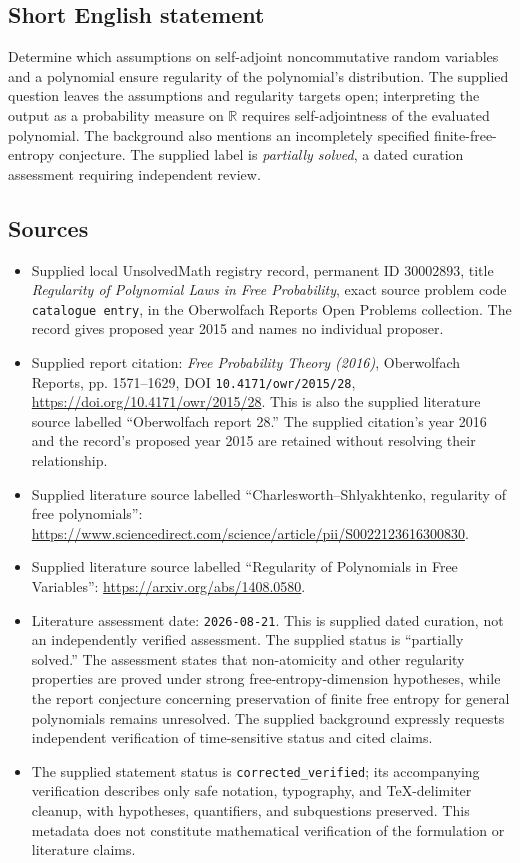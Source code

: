 \documentclass[11pt]{article}
\newcommand{\R}{\mathbb{R}}
\begin{document}
\subsection{Short English statement}
Determine which assumptions on self-adjoint noncommutative random variables and a polynomial ensure regularity of the polynomial's distribution. The supplied question leaves the assumptions and regularity targets open; interpreting the output as a probability measure on \(\R\) requires self-adjointness of the evaluated polynomial. The background also mentions an incompletely specified finite-free-entropy conjecture. The supplied label is \emph{partially solved}, a dated curation assessment requiring independent review.
\subsection{Sources}
\begin{itemize}
\item Supplied local UnsolvedMath registry record, permanent ID \(30002893\), title \emph{Regularity of Polynomial Laws in Free Probability}, exact source problem code \texttt{catalogue entry}, in the Oberwolfach Reports Open Problems collection. The record gives proposed year 2015 and names no individual proposer.
\item Supplied report citation: \emph{Free Probability Theory (2016)}, Oberwolfach Reports, pp. 1571--1629, DOI \texttt{10.4171/owr/2015/28}, \url{https://doi.org/10.4171/owr/2015/28}. This is also the supplied literature source labelled ``Oberwolfach report 28.'' The supplied citation's year 2016 and the record's proposed year 2015 are retained without resolving their relationship.
\item Supplied literature source labelled ``Charlesworth--Shlyakhtenko, regularity of free polynomials'': \url{https://www.sciencedirect.com/science/article/pii/S0022123616300830}.
\item Supplied literature source labelled ``Regularity of Polynomials in Free Variables'': \url{https://arxiv.org/abs/1408.0580}.
\item Literature assessment date: \texttt{2026-08-21}. This is supplied dated curation, not an independently verified assessment. The supplied status is ``partially solved.'' The assessment states that non-atomicity and other regularity properties are proved under strong free-entropy-dimension hypotheses, while the report conjecture concerning preservation of finite free entropy for general polynomials remains unresolved. The supplied background expressly requests independent verification of time-sensitive status and cited claims.
\item The supplied statement status is \texttt{corrected\_verified}; its accompanying verification describes only safe notation, typography, and TeX-delimiter cleanup, with hypotheses, quantifiers, and subquestions preserved. This metadata does not constitute mathematical verification of the formulation or literature claims.
\end{itemize}
\end{document}
